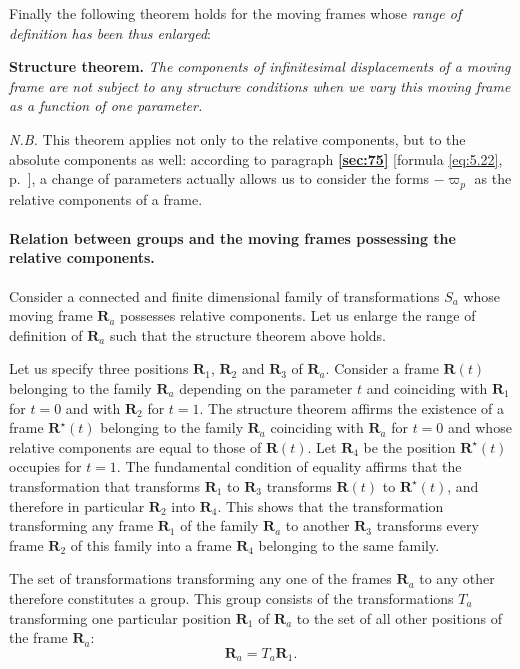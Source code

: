 \documentclass[leqno,11pt]{book}
\numberwithin{equation}{chapter}
\theoremstyle{shape1}
\theoremstyle{shapesmall}
\newcommand{\fsref}[1]{{\rm\textsection\textbf{\ref{sec:#1}}}}
\newcommand{\str}{^{\star}}
\newcommand{\vp}{\varpi}
\newcommand{\somespace}{\vspace{9pt}}
\begin{document}
Finally the following theorem holds for the moving frames whose \emph{range of definition has been thus enlarged}:

\somespace

\textbf{Structure theorem.} \emph{The components of infinitesimal displacements of a moving frame are not subject to any structure conditions when we vary this moving frame as a function of one parameter.}

\somespace

\emph{N.B.} This theorem applies not only to the relative components, but to the absolute components as well: according to paragraph \fsref{75} [formula \eqref{eq:5.22}, p.~\pageref{eq:5.22}], a change of parameters actually allows us to consider the forms $-\vp_{p}$ as the relative components of a frame.

\paragraph{Relation between groups and the moving frames possessing the relative components.}
\label{sec:78}
Consider a connected and finite dimensional family of transformations $S_{a}$ whose moving frame $\mathbf{R}_{a}$ possesses relative components. Let us enlarge the range of definition of $\mathbf{R}_{a}$ such that the structure theorem above holds.

Let us specify three positions $\mathbf{R}_{1}$, $\mathbf{R}_{2}$ and $\mathbf{R}_{3}$ of $\mathbf{R}_{a}$. Consider a frame $\mathbf{R}(t)$ belonging to the family $\mathbf{R}_{a}$ depending on the parameter $t$ and coinciding with $\mathbf{R}_{1}$ for $t=0$ and with $\mathbf{R}_{2}$ for $t=1$. The structure theorem affirms the existence of a frame $\mathbf{R}\str(t)$ belonging to the family $\mathbf{R}_{a}$ coinciding with $\mathbf{R}_{a}$ for $t=0$ and whose relative components are equal to those of $\mathbf{R}(t)$. Let $\mathbf{R}_{4}$ be the position $\mathbf{R}\str(t)$ occupies for $t=1$. The fundamental condition of equality affirms that the transformation that transforms $\mathbf{R}_{1}$ to $\mathbf{R}_{3}$ transforms $\mathbf{R}(t)$ to $\mathbf{R}\str(t)$, and therefore in particular $\mathbf{R}_{2}$ into $\mathbf{R}_{4}$. This shows that the transformation transforming any frame $\mathbf{R}_{1}$ of the family $\mathbf{R}_{a}$ to another $\mathbf{R}_{3}$ transforms every frame $\mathbf{R}_{2}$ of this family into a frame $\mathbf{R}_{4}$ belonging to the same family.

The set of transformations transforming any one of the frames $\mathbf{R}_{a}$ to any other therefore constitutes a group. This group consists of the transformations $T_{a}$ transforming one particular position $\mathbf{R}_{1}$ of $\mathbf{R}_{a}$ to the set of all other positions of the frame $\mathbf{R}_{a}$:
\begin{equation}
  \label{eq:5.24}
  \mathbf{R}_{a}=T_{a}\mathbf{R}_{1}.
\end{equation}
\end{document}
